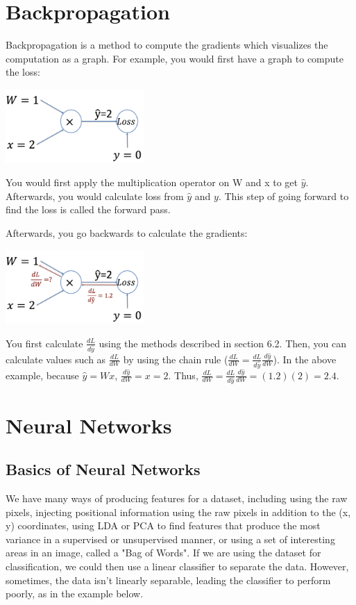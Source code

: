 \documentclass{article}
\begin{document}
\section{Backpropagation}
Backpropagation is a method to compute the gradients which visualizes the computation as a graph. For example, you would first have a graph to compute the loss:

\includegraphics[width=200px]{backprop_pic_2.png}

You would first apply the multiplication operator on W and x to get $\hat{y}$. Afterwards, you would calculate loss from $\hat{y}$ and $y$. This step of going forward to find the loss is called the forward pass.

Afterwards, you go backwards to calculate the gradients:

\includegraphics[width=200px]{backprop_pic_1.png}

You first calculate $\frac{dL}{d\hat{y}}$ using the methods described in section 6.2. Then, you can calculate values such as $\frac{dL}{dW}$ by using the chain rule ($\frac{dL}{dW} = \frac{dL}{d\hat{y}} \frac{d\hat{y}}{dW}$). In the above example, because $\hat{y} = Wx$, $\frac{d\hat{y}}{dW} = x = 2$. Thus, $\frac{dL}{dW} = \frac{dL}{d\hat{y}} \frac{d\hat{y}}{dW} = (1.2)(2) = 2.4.$

\section{Neural Networks}

\subsection{Basics of Neural Networks}

We have many ways of producing features for a dataset, including using the raw pixels, injecting positional information using the raw pixels in addition to the (x, y) coordinates, using LDA or PCA to find features that produce the most variance in a supervised or unsupervised manner, or using a set of interesting areas in an image, called a "Bag of Words". If we are using the dataset for classification, we could then use a linear classifier to separate the data. However, sometimes, the data isn't linearly separable, leading the classifier to perform poorly, as in the example below.
\end{document}
